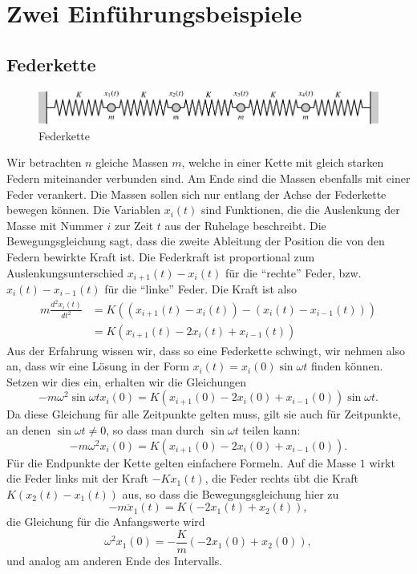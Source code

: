 \section{Zwei Einführungsbeispiele}
\subsection{Federkette}
\begin{figure}
\begin{center}
\includegraphics[width=\hsize]{images/e-1}
\end{center}
\caption{Federkette}
\end{figure}
Wir betrachten $n$ gleiche Massen $m$, welche in einer Kette mit gleich
starken Federn miteinander verbunden sind.
Am Ende sind die Massen
ebenfalls mit einer Feder verankert.
Die Massen sollen sich nur entlang der Achse der Federkette bewegen können.
Die Variablen $x_i(t)$ sind Funktionen, die die Auslenkung der Masse mit
Nummer $i$ zur Zeit $t$ aus der Ruhelage beschreibt.
Die Bewegungsgleichung sagt,
dass die zweite Ableitung der Position die von den Federn bewirkte Kraft
ist.
Die Federkraft ist proportional zum Auslenkungsunterschied
$x_{i+1}(t)-x_i(t)$ für die ``rechte'' Feder, bzw.~
$x_{i}(t)-x_{i-1}(t)$ für die ``linke'' Feder.
Die Kraft ist also
\begin{align*}
m\frac{d^2x_i(t)}{dt^2}
&=K((x_{i+1}(t)-x_i(t))-(x_i(t)-x_{i-1}(t)))\\
&=K(x_{i+1}(t)-2x_i(t)+x_{i-1}(t))
\end{align*}
Aus der Erfahrung wissen wir, dass so eine Federkette schwingt, wir nehmen also
an, dass wir eine Lösung in der Form $x_i(t)=x_i(0)\sin\omega t$ finden
können.
Setzen wir dies ein, erhalten wir die Gleichungen
\[
-m\omega^2\sin\omega t x_i(0)=K(x_{i+1}(0)-2x_i(0)+x_{i-1}(0))\sin\omega t.
\]
Da diese Gleichung für alle Zeitpunkte gelten muss, gilt sie auch für
Zeitpunkte, an denen $\sin\omega t\ne 0$, so dass man durch $\sin\omega t$
teilen kann:
\[
-m\omega^2 x_i(0)=K(x_{i+1}(0)-2x_i(0)+x_{i-1}(0)).
\]
Für die Endpunkte der Kette gelten einfachere Formeln.
Auf die Masse $1$
wirkt die Feder links mit der Kraft $-Kx_1(t)$, die Feder rechts übt die
Kraft $K(x_2(t)-x_1(t))$ aus, so dass die Bewegungsgleichung hier zu
\[
-m\ddot x_1(t)=K(-2x_1(t)+x_2(t)),
\]
die Gleichung für die Anfangswerte wird
\[
\omega^2 x_1(0)=-\frac{K}{m}(-2x_1(0)+x_2(0)),
\]
und analog am anderen Ende des Intervalls.

